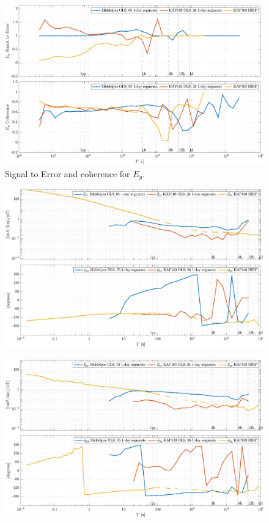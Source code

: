 \documentclass{article}
\begin{document}
\begin{figure}[h!]
\centering
\includegraphics[width=\textwidth]{figures/KAP103_Middelpos/SN_compare-E_y.pdf}
\caption{Signal to Error and coherence for $E_y$.}
\label{fig:universe}
\end{figure}

\clearpage

\begin{figure}[h!]
\centering
\includegraphics[width=\textwidth]{figures/KAP103_Middelpos/transferfnZ_compare-Z_yx_Magnitude_Phase.pdf}
\caption{}
\label{fig:universe}
\end{figure}

\begin{figure}[h!]
\centering
\includegraphics[width=\textwidth]{figures/KAP103_Middelpos/transferfnZ_compare-Z_yy_Magnitude_Phase.pdf}
\caption{}
\label{fig:universe}
\end{figure}

\clearpage
\end{document}
